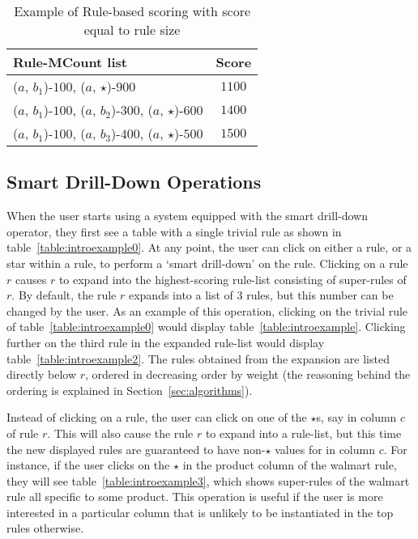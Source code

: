 \begin{table}
\centering
\begin{tabular}{ | l | c | }
 \hline Rule-MCount list & Score \\ \hline
  ($a$, $b_1$)-$100$, ($a$, $\star$)-$900$ & $1100$ \\
  ($a$, $b_1$)-$100$, ($a$, $b_2$)-$300$, ($a$, $\star$)-$600$ & $1400$  \\
  ($a$, $b_1$)-$100$, ($a$, $b_3$)-$400$, ($a$, $\star$)-$500$ & $1500$ \\ \hline
\end{tabular}
\vspace{-15pt}
\caption{Example of Rule-based scoring with score equal to rule size \label{table:sizescoringexample}}
\end{table}

\subsection{Smart Drill-Down Operations}
\label{sec:interface}
When the user starts using a system equipped with
the smart drill-down operator, they first see a table with a single trivial rule as shown in table~\ref{table:introexample0}. At any point, the user can click on either a rule, or a star within a rule, to perform a `smart drill-down' on the rule. Clicking on a rule $r$ causes $r$ to expand into the highest-scoring rule-list consisting of super-rules of $r$. By default, the rule $r$ expands into a list of $3$ rules, but this number can be changed by the user. As an example of this operation, clicking on the trivial rule of table~\ref{table:introexample0} would display table~\ref{table:introexample}. Clicking further on the third rule in the expanded rule-list would display table~\ref{table:introexample2}. The rules obtained from the expansion are listed directly below $r$, ordered in decreasing order by weight (the reasoning behind the ordering is explained in Section~\ref{sec:algorithms}).

Instead of clicking on a rule, the user can click on one of the $\star$s, say in column $c$ of rule $r$. This will also cause the rule $r$ to expand into a rule-list, but this time the new displayed rules are guaranteed to have non-$\star$ values for in column $c$. For instance, if the user clicks on the $\star$ in the product column of the walmart rule, they will see table~\ref{table:introexample3}, which shows super-rules of the walmart rule all specific to some product. This operation is useful if the user is more interested in a particular column that is unlikely to be instantiated in the top rules otherwise. 

